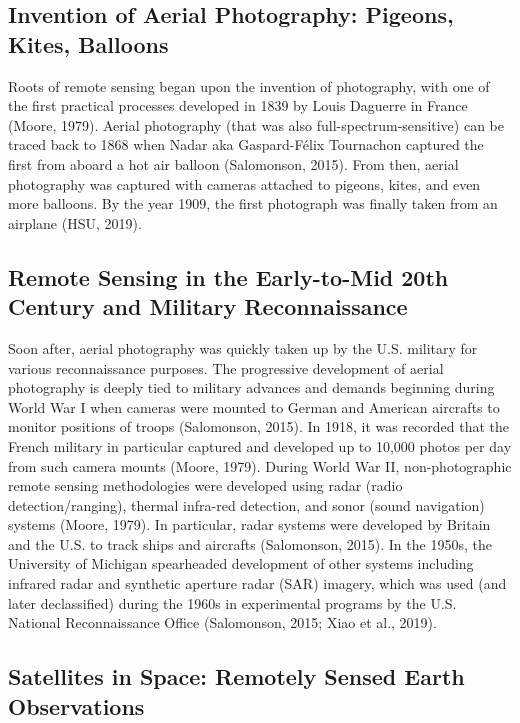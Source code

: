 \documentclass{book}\usepackage{knitr}
\begin{document}
\subsection{Invention of Aerial Photography: Pigeons, Kites, Balloons}

Roots of remote sensing began upon the invention of photography, with one of the first practical processes developed in 1839 by Louis Daguerre in France (Moore, 1979). Aerial photography (that was also full-spectrum-sensitive) can be traced back to 1868 when Nadar aka Gaspard-Félix Tournachon captured the first from aboard a hot air balloon (Salomonson, 2015). From then, aerial photography was captured with cameras attached to pigeons, kites, and even more balloons. By the year 1909, the first photograph was finally taken from an airplane (HSU, 2019). 

\subsection{Remote Sensing in the Early-to-Mid 20th Century and Military Reconnaissance}

Soon after, aerial photography was quickly taken up by the U.S. military for various reconnaissance purposes. The progressive development of aerial photography is deeply tied to military advances and demands beginning during World War I when cameras were mounted to German and American aircrafts to monitor positions of troops (Salomonson, 2015). In 1918, it was recorded that the French military in particular captured and developed up to 10,000 photos per day from such camera mounts (Moore, 1979). During World War II, non-photographic remote sensing methodologies were developed using radar (radio detection/ranging), thermal infra-red detection, and sonor (sound navigation) systems (Moore, 1979). In particular, radar systems were developed by Britain and the U.S. to track ships and aircrafts (Salomonson, 2015). In the 1950s, the University of Michigan spearheaded development of other systems including infrared radar and synthetic aperture radar (SAR) imagery, which was used (and later declassified) during the 1960s in experimental programs by the U.S. National Reconnaissance Office (Salomonson, 2015; Xiao et al., 2019). 

\subsection{Satellites in Space: Remotely Sensed Earth Observations}
\end{document}
